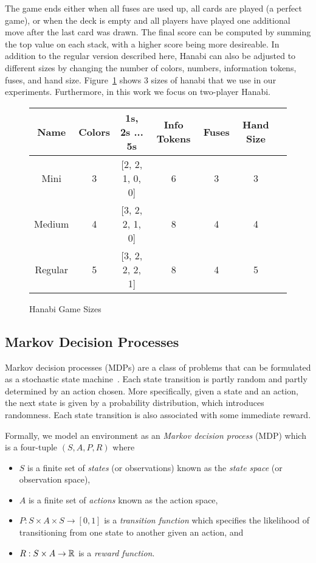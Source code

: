 The game ends either when all fuses are used up, all cards are played (a perfect
game), or when the deck is empty and all players have played one additional
move after the last card was drawn. The final score can be computed by summing
the top value on each stack, with a higher score being more desireable. In addition
to the regular version described here, Hanabi can also be adjusted to different
sizes by changing the number of colors, numbers, information tokens, fuses, and
hand size. Figure~\ref{fig:hanabisizes} shows 3 sizes of hanabi that we use in
our experiments. Furthermore, in this work we focus on two-player Hanabi.

\begin{figure}[ht]
    \centering
    \begin{tabular}{|c | c | c | c | c | c | c |} \hline
        Name        & Colors & 1s, 2s ... 5s  & Info Tokens & Fuses & Hand Size \\ \hline
        Mini        & 3      & [2, 2, 1, 0, 0]    & 6           & 3     & 3 \\ \hline
        Medium      & 4      & [3, 2, 2, 1, 0] & 8           & 4     & 4 \\ \hline
        Regular     & 5      & [3, 2, 2, 2, 1] & 8 & 4 & 5 \\ \hline
    \end{tabular}
    \caption{Hanabi Game Sizes}
    \label{fig:hanabisizes}
\end{figure}





\subsection{Markov Decision Processes}
\label{sec:background:mdp}

Markov decision processes (MDPs) are a class of problems that can be formulated
as a stochastic state machine~\cite{mdp}. Each state transition is partly
random and partly determined by an action chosen. More specifically, given a
state and an action, the next state is given by a probability distribution,
which introduces randomness. Each state transition is also associated with some
immediate reward.

Formally, we model an environment as an \emph{Markov decision process} (MDP)
which is a four-tuple $(S, A, P, R)$ where
\begin{itemize}
  \setlength\itemsep{0em}
  \item
    $S$ is a finite set of \emph{states} (or observations) known as the
    \emph{state space} (or observation space),
  \item
    $A$ is a finite set of \emph{actions} known as the action space,
  \item
    $P: S \times A \times S \to [0, 1]$ is a \emph{transition function} which
    specifies the likelihood of transitioning from one state to another given
    an action, and
  \item
    $R: S \times A \to \mathbb{R}$ is a \emph{reward function}.
\end{itemize}

